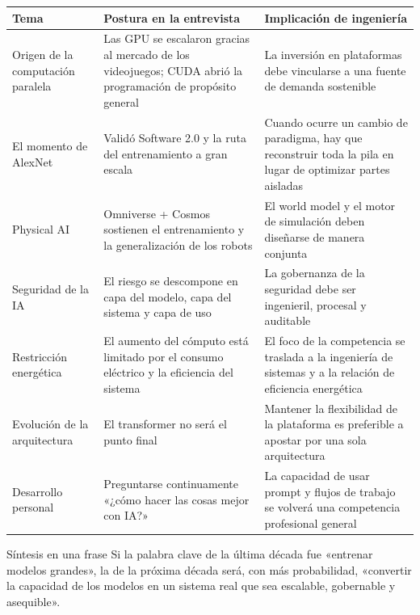 \documentclass[a4paper]{article}
\begin{document}
\begin{longtable}{p{} p{} p{}}
\toprule
\textbf{Tema} & \textbf{Postura en la entrevista} & \textbf{Implicación de ingeniería} \\
\midrule
Origen de la computación paralela & Las GPU se escalaron gracias al mercado de los videojuegos; CUDA abrió la programación de propósito general & La inversión en plataformas debe vincularse a una fuente de demanda sostenible \\
\midrule
El momento de AlexNet & Validó Software 2.0 y la ruta del entrenamiento a gran escala & Cuando ocurre un cambio de paradigma, hay que reconstruir toda la pila en lugar de optimizar partes aisladas \\
\midrule
Physical AI & Omniverse + Cosmos sostienen el entrenamiento y la generalización de los robots & El world model y el motor de simulación deben diseñarse de manera conjunta \\
\midrule
Seguridad de la IA & El riesgo se descompone en capa del modelo, capa del sistema y capa de uso & La gobernanza de la seguridad debe ser ingenieril, procesal y auditable \\
\midrule
Restricción energética & El aumento del cómputo está limitado por el consumo eléctrico y la eficiencia del sistema & El foco de la competencia se traslada a la ingeniería de sistemas y a la relación de eficiencia energética \\
\midrule
Evolución de la arquitectura & El transformer no será el punto final & Mantener la flexibilidad de la plataforma es preferible a apostar por una sola arquitectura \\
\midrule
Desarrollo personal & Preguntarse continuamente «¿cómo hacer las cosas mejor con IA?» & La capacidad de usar prompt y flujos de trabajo se volverá una competencia profesional general \\
\bottomrule
\end{longtable}

\begin{importantbox}{Síntesis en una frase}
Si la palabra clave de la última década fue «entrenar modelos grandes», la de la próxima década será, con más probabilidad, «convertir la capacidad de los modelos en un sistema real que sea escalable, gobernable y asequible».
\end{importantbox}
\end{document}
